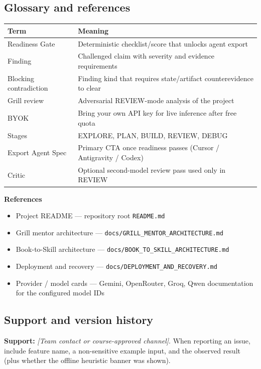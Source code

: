 \documentclass[11pt,a4paper]{article}
\newcommand{\placeholder}[1]{\textit{[#1]}}
\begin{document}
\subsection{Glossary and references}
\begin{tabularx}{\textwidth}{@{}L{4.2cm}Y@{}}
\toprule
\textbf{Term} & \textbf{Meaning} \\
\midrule
Readiness Gate & Deterministic checklist/score that unlocks agent export \\
Finding & Challenged claim with severity and evidence requirements \\
Blocking contradiction & Finding kind that requires state/artifact counterevidence to clear \\
Grill review & Adversarial REVIEW-mode analysis of the project \\
BYOK & Bring your own API key for live inference after free quota \\
Stages & EXPLORE, PLAN, BUILD, REVIEW, DEBUG \\
Export Agent Spec & Primary CTA once readiness passes (Cursor / Antigravity / Codex) \\
Critic & Optional second-model review pass used only in REVIEW \\
\bottomrule
\end{tabularx}

\vspace{0.6em}
\noindent\textbf{References}
\begin{itemize}
  \item Project README --- repository root \texttt{README.md}
  \item Grill mentor architecture --- \texttt{docs/GRILL\_MENTOR\_ARCHITECTURE.md}
  \item Book-to-Skill architecture --- \texttt{docs/BOOK\_TO\_SKILL\_ARCHITECTURE.md}
  \item Deployment and recovery --- \texttt{docs/DEPLOYMENT\_AND\_RECOVERY.md}
  \item Provider / model cards --- Gemini, OpenRouter, Groq, Qwen documentation for the configured model IDs
\end{itemize}

\subsection{Support and version history}
\textbf{Support:} \placeholder{Team contact or course-approved channel}.
When reporting an issue, include feature name, a non-sensitive example input,
and the observed result (plus whether the offline heuristic banner was shown).
\end{document}
